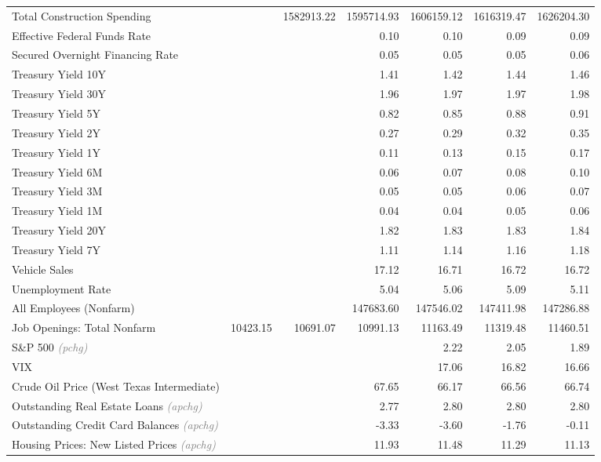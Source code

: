 \documentclass[11pt, letterpaper]{article}\usepackage[]{graphicx}\usepackage[]{color}
\begin{document}
\begin{table}[H]
\begin{tabular}{lrrrrrr}
  Total Construction Spending &  & 1582913.22 & 1595714.93 & 1606159.12 & 1616319.47 & 1626204.30 \\ 
  Effective Federal Funds Rate &  &  & 0.10 & 0.10 & 0.09 & 0.09 \\ 
  Secured Overnight Financing Rate &  &  & 0.05 & 0.05 & 0.05 & 0.06 \\ 
  Treasury Yield 10Y &  &  & 1.41 & 1.42 & 1.44 & 1.46 \\ 
  Treasury Yield 30Y &  &  & 1.96 & 1.97 & 1.97 & 1.98 \\ 
  Treasury Yield 5Y &  &  & 0.82 & 0.85 & 0.88 & 0.91 \\ 
  Treasury Yield 2Y &  &  & 0.27 & 0.29 & 0.32 & 0.35 \\ 
  Treasury Yield 1Y &  &  & 0.11 & 0.13 & 0.15 & 0.17 \\ 
  Treasury Yield 6M &  &  & 0.06 & 0.07 & 0.08 & 0.10 \\ 
  Treasury Yield 3M &  &  & 0.05 & 0.05 & 0.06 & 0.07 \\ 
  Treasury Yield 1M &  &  & 0.04 & 0.04 & 0.05 & 0.06 \\ 
  Treasury Yield 20Y &  &  & 1.82 & 1.83 & 1.83 & 1.84 \\ 
  Treasury Yield 7Y &  &  & 1.11 & 1.14 & 1.16 & 1.18 \\ 
  Vehicle Sales &  &  & 17.12 & 16.71 & 16.72 & 16.72 \\ 
  Unemployment Rate &  &  & 5.04 & 5.06 & 5.09 & 5.11 \\ 
  All Employees (Nonfarm) &  &  & 147683.60 & 147546.02 & 147411.98 & 147286.88 \\ 
  Job Openings: Total Nonfarm & 10423.15 & 10691.07 & 10991.13 & 11163.49 & 11319.48 & 11460.51 \\ 
  S\&P 500 \textit{\footnotesize\textcolor{gray}{(pchg)}} &  &  &  & 2.22 & 2.05 & 1.89 \\ 
  VIX &  &  &  & 17.06 & 16.82 & 16.66 \\ 
  Crude Oil Price (West Texas Intermediate) &  &  & 67.65 & 66.17 & 66.56 & 66.74 \\ 
  Outstanding Real Estate Loans \textit{\footnotesize\textcolor{gray}{(apchg)}} &  &  & 2.77 & 2.80 & 2.80 & 2.80 \\ 
  Outstanding Credit Card Balances \textit{\footnotesize\textcolor{gray}{(apchg)}} &  &  & -3.33 & -3.60 & -1.76 & -0.11 \\ 
  Housing Prices: New Listed Prices \textit{\footnotesize\textcolor{gray}{(apchg)}} &  &  & 11.93 & 11.48 & 11.29 & 11.13 \\ 

\end{tabular}
\end{table}
\end{document}

